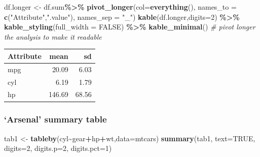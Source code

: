 \documentclass[
]{article}
\newenvironment{Shaded}{\begin{snugshade}}{\end{snugshade}}
\newcommand{\AttributeTok}[1]{\textcolor[rgb]{0.13,0.29,0.53}{#1}}
\newcommand{\CommentTok}[1]{\textcolor[rgb]{0.56,0.35,0.01}{\textit{#1}}}
\newcommand{\ConstantTok}[1]{\textcolor[rgb]{0.56,0.35,0.01}{#1}}
\newcommand{\DecValTok}[1]{\textcolor[rgb]{0.00,0.00,0.81}{#1}}
\newcommand{\FunctionTok}[1]{\textcolor[rgb]{0.13,0.29,0.53}{\textbf{#1}}}
\newcommand{\NormalTok}[1]{#1}
\newcommand{\OtherTok}[1]{\textcolor[rgb]{0.56,0.35,0.01}{#1}}
\newcommand{\SpecialCharTok}[1]{\textcolor[rgb]{0.81,0.36,0.00}{\textbf{#1}}}
\newcommand{\StringTok}[1]{\textcolor[rgb]{0.31,0.60,0.02}{#1}}
\begin{document}
\begin{Shaded}
\begin{Highlighting}[]
\NormalTok{df.longer }\OtherTok{\textless{}{-}}\NormalTok{ df.sum}\SpecialCharTok{\%\textgreater{}\%} \FunctionTok{pivot\_longer}\NormalTok{(}\AttributeTok{col=}\FunctionTok{everything}\NormalTok{(),  }
\AttributeTok{names\_to =} \FunctionTok{c}\NormalTok{(}\StringTok{"Attribute"}\NormalTok{,}\StringTok{".value"}\NormalTok{),}
  \AttributeTok{names\_sep =} \StringTok{"\_"}\NormalTok{)}
\FunctionTok{kable}\NormalTok{(df.longer,}\AttributeTok{digits=}\DecValTok{2}\NormalTok{) }\SpecialCharTok{\%\textgreater{}\%}
  \FunctionTok{kable\_styling}\NormalTok{(}\AttributeTok{full\_width =} \ConstantTok{FALSE}\NormalTok{) }\SpecialCharTok{\%\textgreater{}\%}
  \FunctionTok{kable\_minimal}\NormalTok{() }\CommentTok{\# pivot longer the analysis to make it readable}
\end{Highlighting}
\end{Shaded}

\begin{table}
\centering
\begin{tabular}{l|r|r}
\hline
Attribute & mean & sd\\
\hline
mpg & 20.09 & 6.03\\
\hline
cyl & 6.19 & 1.79\\
\hline
hp & 146.69 & 68.56\\
\hline
\end{tabular}
\end{table}

\hypertarget{arsenal-summary-table}{%
\subsubsection{`Arsenal' summary table}\label{arsenal-summary-table}}

\begin{Shaded}
\begin{Highlighting}[]
\NormalTok{tab1 }\OtherTok{\textless{}{-}} \FunctionTok{tableby}\NormalTok{(cyl}\SpecialCharTok{\textasciitilde{}}\NormalTok{gear}\SpecialCharTok{+}\NormalTok{hp}\SpecialCharTok{+}\NormalTok{wt,}\AttributeTok{data=}\NormalTok{mtcars)}
\FunctionTok{summary}\NormalTok{(tab1, }\AttributeTok{text=}\ConstantTok{TRUE}\NormalTok{, }\AttributeTok{digits=}\DecValTok{2}\NormalTok{, }\AttributeTok{digits.p=}\DecValTok{2}\NormalTok{, }\AttributeTok{digits.pct=}\DecValTok{1}\NormalTok{)}
\end{Highlighting}
\end{Shaded}
\end{document}
